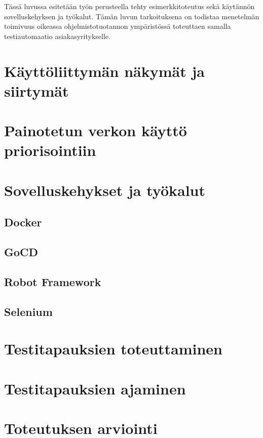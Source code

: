 Tässä luvussa esitetään työn perusteella tehty esimerkkitoteutus sekä käytännön sovelluskehyksen ja työkalut.
Tämän luvun tarkoituksena on todistaa menetelmän toimivuus oikeassa ohjelmistotuotannon ympäristössä toteuttaen samalla testiautomaatio asiakasyritykselle.

\section{Käyttöliittymän näkymät ja siirtymät}


\section{Painotetun verkon käyttö priorisointiin}


\section{Sovelluskehykset ja työkalut}


  \subsection{Docker}


  \subsection{GoCD}


  \subsection{Robot Framework}


  \subsection{Selenium}


\section{Testitapauksien toteuttaminen}


\section{Testitapauksien ajaminen}


\section{Toteutuksen arviointi}

